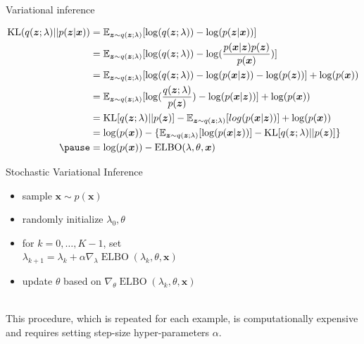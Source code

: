 \documentclass{beamer}		%
\newcommand{\E}{\mathbb{E}}
\DeclareMathOperator*{\KL}{KL}
\DeclareMathOperator*{\ELBO}{ELBO}
\begin{document}
\begin{frame}{Variational inference}

\begin{small}
\begin{eqnarray*}
\begin{aligned}
\KL(q(\bm{z};\lambda)||p(\bm{z}|\bm{x})) &= \E_{\bm{z} \sim q(\bm{z};\lambda)}[\log(q(\bm{z};\lambda)) - \log(p(\bm{z}|\bm{x}))]\\
&= \E_{\bm{z} \sim q(\bm{z};\lambda)}[\log(q(\bm{z};\lambda)) - \log(\frac{p(\bm{x}|\bm{z})p(\bm{z})}{p(\bm{x})})]\\
&= \E_{\bm{z} \sim q(\bm{z};\lambda)}[\log(q(\bm{z};\lambda)) - \log(p(\bm{x}|\bm{z})) - \log(p(\bm{z}))] + \log(p(\bm{x}))\\
&= \E_{\bm{z} \sim q(\bm{z};\lambda)}[\log(\frac{q(\bm{z};\lambda)}{p(\bm{z})}) - \log(p(\bm{x}|\bm{z}))] + \log(p(\bm{x}))\\
&= \KL[q(\bm{z};\lambda)||p(\bm{z})] - \E_{\bm{z} \sim q(\bm{z};\lambda)}[log(p(\bm{x}|\bm{z}))] + \log(p(\bm{x}))\\
&= \log(p(\bm{x})) - \{\E_{\bm{z} \sim q(\bm{z};\lambda)}[\log(p(\bm{x}|\bm{z}))] - \KL[q(\bm{z};\lambda)||p(\bm{z})]\}\\
\pause
&= \log(p(\bm{x})) - \ELBO(\lambda, \theta, \bm{x})
\end{aligned}    
\end{eqnarray*}
\end{small}

\end{frame}



\begin{frame}{Stochastic Variational Inference}

\begin{itemize}
    \item sample $\bm{x}\sim p(\bm{x})$
    \item randomly initialize $\lambda_0, \theta$
    \item for $k=0,\ldots,K-1$, set \\ $\lambda_{k+1} = \lambda_k + \alpha \nabla_{\lambda} \ELBO(\lambda_k, \theta, \bm{x})$
    \item update $\theta$ based on $\nabla_{\theta} \ELBO(\lambda_k, \theta, \bm{x})$
\end{itemize}

\pause
~\\
This procedure, which is repeated for each example, is computationally expensive and requires setting step-size hyper-parameters $\alpha$.

\end{frame}
\end{document}
